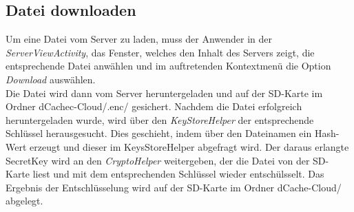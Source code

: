 \documentclass[10pt, a4paper,headsepline,pointednumbers]{scrreprt}
\begin{document}
\subsection{Datei downloaden}
Um eine Datei vom Server zu laden, muss der Anwender in der \textit{ServerViewActivity}, das Fenster, welches den Inhalt des Servers zeigt, die entsprechende Datei anwählen und im auftretenden Kontextmenü die Option \textit{Download} auswählen.  \\
Die Datei wird dann vom Server heruntergeladen und auf der SD-Karte im Ordner dCachec-Cloud/.enc/ gesichert. Nachdem die Datei erfolgreich heruntergeladen wurde, wird über den \textit{KeyStoreHelper} der entsprechende Schlüssel herausgesucht. Dies geschieht, indem über den Dateinamen ein Hash-Wert erzeugt und dieser im KeysStoreHelper abgefragt wird. Der daraus erlangte SecretKey wird an den \textit{CryptoHelper} weitergeben, der die Datei von der SD-Karte liest und mit dem entsprechenden Schlüssel wieder entschülsselt. Das Ergebnis der Entschlüsselung wird auf der SD-Karte im Ordner dCache-Cloud/ abgelegt.
\end{document}
